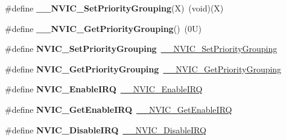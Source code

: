 \begin{DoxyCompactItemize}
\#define {\bfseries \+\_\+\+\_\+\+N\+V\+I\+C\+\_\+\+Set\+Priority\+Grouping}(X)~(void)(X)
\item 
\mbox{\label{group___c_m_s_i_s___core___n_v_i_c_functions_gab2072fe50f6d7cd208f6768919f59fae}} 
\#define {\bfseries \+\_\+\+\_\+\+N\+V\+I\+C\+\_\+\+Get\+Priority\+Grouping}()~(0\+U)
\item 
\mbox{\label{group___c_m_s_i_s___core___n_v_i_c_functions_ga0e798d5aec68cdd8263db86a76df788f}} 
\#define {\bfseries N\+V\+I\+C\+\_\+\+Set\+Priority\+Grouping}~\hyperlink{group___c_m_s_i_s___core___n_v_i_c_functions_gafc94dcbaee03e4746ade1f5bb9aaa56d}{\+\_\+\+\_\+\+N\+V\+I\+C\+\_\+\+Set\+Priority\+Grouping}
\item 
\mbox{\label{group___c_m_s_i_s___core___n_v_i_c_functions_ga4eeb9214f2264fc23c34ad5de2d3fa11}} 
\#define {\bfseries N\+V\+I\+C\+\_\+\+Get\+Priority\+Grouping}~\hyperlink{group___c_m_s_i_s___core___n_v_i_c_functions_ga9b894af672df4373eb637f8288845c05}{\+\_\+\+\_\+\+N\+V\+I\+C\+\_\+\+Get\+Priority\+Grouping}
\item 
\mbox{\label{group___c_m_s_i_s___core___n_v_i_c_functions_ga57b3064413dbc7459d9646020fdd8bef}} 
\#define {\bfseries N\+V\+I\+C\+\_\+\+Enable\+I\+RQ}~\hyperlink{group___c_m_s_i_s___core___n_v_i_c_functions_ga71227e1376cde11eda03fcb62f1b33ea}{\+\_\+\+\_\+\+N\+V\+I\+C\+\_\+\+Enable\+I\+RQ}
\item 
\mbox{\label{group___c_m_s_i_s___core___n_v_i_c_functions_ga857de13232ec65dd15087eaa15bc4a69}} 
\#define {\bfseries N\+V\+I\+C\+\_\+\+Get\+Enable\+I\+RQ}~\hyperlink{group___c_m_s_i_s___core___n_v_i_c_functions_gaaeb5e7cc0eaad4e2817272e7bf742083}{\+\_\+\+\_\+\+N\+V\+I\+C\+\_\+\+Get\+Enable\+I\+RQ}
\item 
\mbox{\label{group___c_m_s_i_s___core___n_v_i_c_functions_ga73b4e251f59cab4e9a5e234aac02ae57}} 
\#define {\bfseries N\+V\+I\+C\+\_\+\+Disable\+I\+RQ}~\hyperlink{group___c_m_s_i_s___core___n_v_i_c_functions_gae016e4c1986312044ee768806537d52f}{\+\_\+\+\_\+\+N\+V\+I\+C\+\_\+\+Disable\+I\+RQ}

\end{DoxyCompactItemize}
